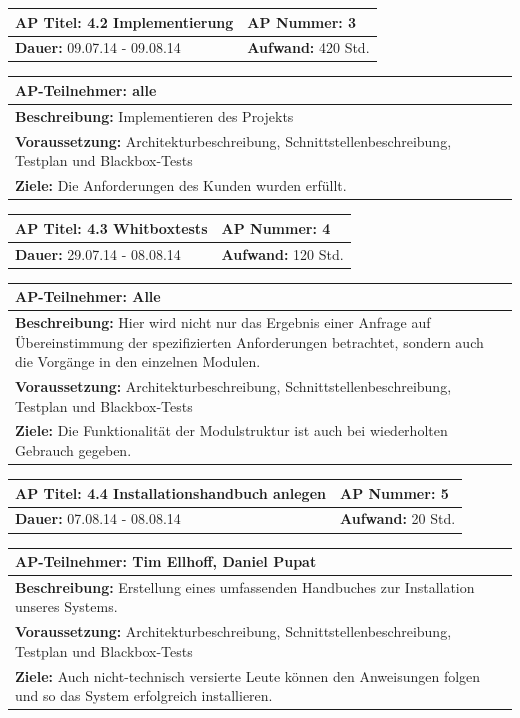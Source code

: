 \documentclass[fontsize=12pt,paper=a4,twoside]{scrartcl}
\begin{document}
\begin{tabular}{|p{7.43cm}|p{7.43cm}|}
\hline
\textbf{AP Titel: }4.2 Implementierung & \textbf{AP Nummer: }3\\ 
\hline
\textbf{Dauer: }09.07.14 - 09.08.14& \textbf{Aufwand: } 420 Std.\\
\hline
\end{tabular}
\begin{tabular}{|p{15.3cm}|}
\hline
\textbf{AP-Teilnehmer: }alle\\
\hline
\textbf{Beschreibung: }Implementieren des Projekts\\
\hline
\textbf{Voraussetzung: }Architekturbeschreibung, Schnittstellenbeschreibung, Testplan und Blackbox-Tests \\
\hline 
\textbf{Ziele: }Die Anforderungen des Kunden wurden erfüllt.\\
\hline 
\end{tabular}

\begin{tabular}{|p{7.43cm}|p{7.43cm}|}
\hline
\textbf{AP Titel: }4.3 Whitboxtests & \textbf{AP Nummer: }4\\ 
\hline
\textbf{Dauer: }29.07.14 - 08.08.14& \textbf{Aufwand: } 120 Std.\\
\hline
\end{tabular}
\begin{tabular}{|p{15.3cm}|}
\hline
\textbf{AP-Teilnehmer: }Alle\\
\hline
\textbf{Beschreibung: }Hier wird nicht nur das Ergebnis einer Anfrage auf Übereinstimmung der spezifizierten Anforderungen betrachtet, sondern auch die Vorgänge 
in den einzelnen Modulen.\\
\hline
\textbf{Voraussetzung: }Architekturbeschreibung, Schnittstellenbeschreibung, Testplan und Blackbox-Tests \\
\hline 
\textbf{Ziele: }Die Funktionalität der Modulstruktur ist auch bei wiederholten Gebrauch gegeben.\\
\hline 
\end{tabular}

\begin{tabular}{|p{7.43cm}|p{7.43cm}|}
\hline
\textbf{AP Titel: }4.4 Installationshandbuch anlegen & \textbf{AP Nummer: }5\\ 
\hline
\textbf{Dauer: }07.08.14 - 08.08.14& \textbf{Aufwand: } 20 Std.\\
\hline
\end{tabular}
\begin{tabular}{|p{15.3cm}|}
\hline
\textbf{AP-Teilnehmer: }Tim Ellhoff, Daniel Pupat\\
\hline
\textbf{Beschreibung: }Erstellung eines umfassenden Handbuches zur Installation unseres Systems.\\
\hline
\textbf{Voraussetzung: }Architekturbeschreibung, Schnittstellenbeschreibung, Testplan und Blackbox-Tests \\
\hline 
\textbf{Ziele: }Auch nicht-technisch versierte Leute können den Anweisungen folgen und so das System erfolgreich installieren.\\
\hline 
\end{tabular}
\end{document}
